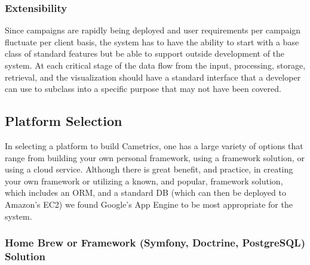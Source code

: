 \documentclass[10pt,a4paper,english]{article}
\begin{document}

\hypertarget{extensibility}{}
\subsubsection*{Extensibility}
\label{extensibility}

Since campaigns are rapidly being deployed and user requirements per campaign fluctuate per client basis, the system has to have the ability to start with a base class of standard features but be able to support outside development of the system. At each critical stage of the data flow from the input, processing, storage, retrieval, and the visualization should have a standard interface that a developer can use to subclass into a specific purpose that may not have been covered.



\hypertarget{platform-selection}{}
\subsection*{Platform Selection}
\label{platform-selection}

In selecting a platform to build Cametrics, one has a large variety of options that range from building your own personal framework, using a framework solution, or using a cloud service. Although there is great benefit, and practice, in creating your own framework or utilizing a known, and popular, framework solution, which includes an ORM, and a standard DB (which can then be deployed to Amazon's EC2) we found Google's App Engine to be most appropriate for the system.



\hypertarget{home-brew-or-framework-symfony-doctrine-postgresql-solution}{}
\subsubsection*{Home Brew or Framework (Symfony, Doctrine, PostgreSQL) Solution}
\label{home-brew-or-framework-symfony-doctrine-postgresql-solution}
\end{document}
